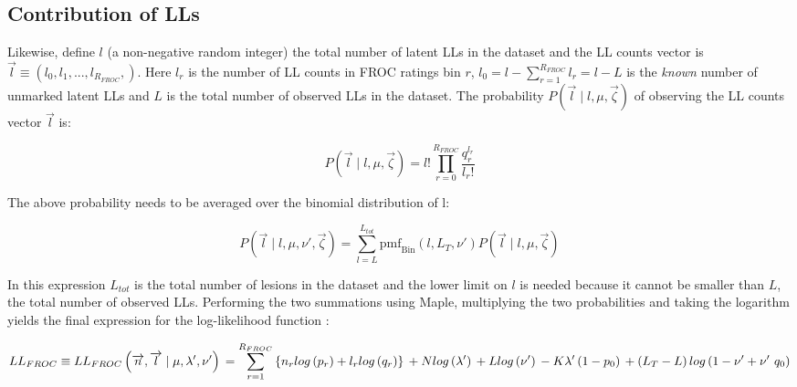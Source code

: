 \documentclass[
]{book}
\begin{document}
\hypertarget{rsm-fitting-froc-lls}{%
\subsection{Contribution of LLs}\label{rsm-fitting-froc-lls}}

Likewise, define \(l\) (a non-negative random integer) the total number of latent LLs in the dataset and the LL counts vector is \(\overrightarrow{l} \equiv \left ( l_0, l_1, ...,l_{R_{FROC}}, \right )\). Here \(l_r\) is the number of LL counts in FROC ratings bin \(r\), \(l_0 = l - \sum_{r=1}^{R_{FROC}} l_r = l - L\) is the \emph{known} number of unmarked latent LLs and \(L\) is the total number of observed LLs in the dataset. The probability \(P\left ( \overrightarrow{l} \mid l, \mu, \overrightarrow{\zeta} \right )\) of observing the LL counts vector \(\overrightarrow{l}\) is:

\begin{equation}
P\left ( \overrightarrow{l} \mid l, \mu, \overrightarrow{\zeta} \right ) = l! \prod_{r=0}^{R_{FROC}} \frac{q_r^{l_r}}{l_r!}
\label{eq:rsm-fitting-plvector}
\end{equation}

The above probability needs to be averaged over the binomial distribution of l:

\begin{equation}
P\left ( \overrightarrow{l} \mid l, \mu, \nu', \overrightarrow{\zeta} \right ) = \sum_{l=L}^{L_{tot}}\text{pmf}_{\text{Bin}} \left ( l, L_T, \nu' \right ) P\left ( \overrightarrow{l} \mid l, \mu, \overrightarrow{\zeta} \right )
\label{eq:rsm-fitting-p-l-mu-nu-prime-zeta}
\end{equation}

In this expression \(L_{tot}\) is the total number of lesions in the dataset and the lower limit on \(l\) is needed because it cannot be smaller than \(L\), the total number of observed LLs. Performing the two summations using Maple, multiplying the two probabilities and taking the logarithm yields the final expression for the log-likelihood function \citep{RN1652}:

\begin{equation}
LL_{FROC} \equiv LL_{FROC}\left ( \overrightarrow{n}, \overrightarrow{l} \mid \mu, \lambda', \nu' \right ) \\
= \sum_{r=1}^{R_{FROC}} \left \{ n_r log\left ( p_r \right ) + l_r log\left ( q_r \right ) \right \} \\
+ N log\left ( \lambda' \right ) \\
+ L log\left ( \nu' \right ) \\
- K \lambda' \left ( 1-p_0 \right ) \\
+ \left ( L_T - L \right ) log \left ( 1 - \nu' + \nu' \ q_0 \right )
\label{eq:rsm-fitting-froc-ll}
\end{equation}
\end{document}
